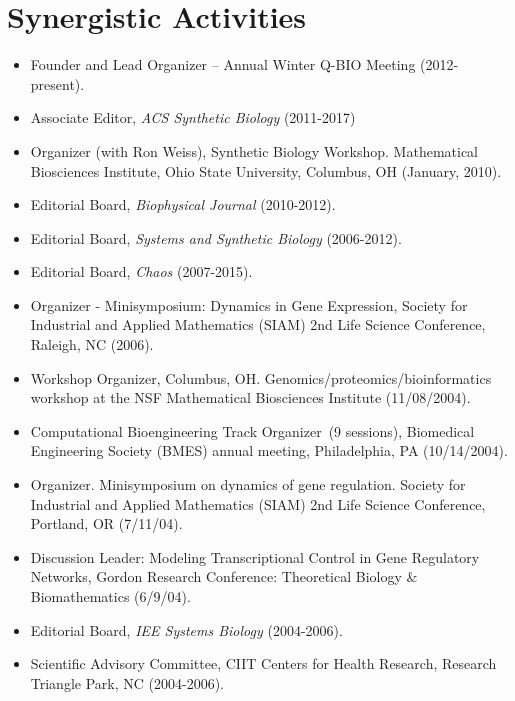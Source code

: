 \documentclass[11pt,a4paper,sans]{moderncv}        %
\begin{document}
%

\section{Synergistic Activities}
\begin{itemize}
\item Founder and Lead Organizer -- Annual Winter Q-BIO Meeting (2012-present). 
\item Associate Editor, {\em ACS Synthetic Biology} (2011-2017)
\item Organizer (with Ron Weiss), Synthetic Biology Workshop.  Mathematical Biosciences Institute, Ohio State University, Columbus, OH (January, 2010).  
\item Editorial Board, {\em Biophysical Journal} (2010-2012). 
\item Editorial Board, {\em Systems and Synthetic Biology} (2006-2012).
\item Editorial Board, {\em Chaos} (2007-2015).
\item Organizer - Minisymposium: Dynamics in Gene Expression, Society for Industrial
and Applied Mathematics (SIAM) 2nd Life Science Conference, Raleigh,
NC (2006).
\item Workshop Organizer, Columbus, OH. Genomics/proteomics/bioinformatics
workshop at the NSF Mathematical Biosciences Institute (11/08/2004).
\item Computational Bioengineering Track Organizer~(9 sessions), Biomedical Engineering Society (BMES) annual meeting, Philadelphia, PA (10/14/2004).
\item Organizer.  Minisymposium on dynamics of gene regulation.
Society for Industrial and Applied Mathematics (SIAM) 2nd Life
Science Conference, Portland, OR (7/11/04).
\item Discussion Leader: Modeling Transcriptional Control in Gene Regulatory Networks,
Gordon Research Conference: Theoretical Biology \& Biomathematics
(6/9/04).
\item Editorial Board, {\em IEE Systems Biology} (2004-2006).
\item Scientific Advisory Committee, CIIT Centers for Health
Research, Research Triangle Park, NC (2004-2006).

\end{itemize}
\end{document}
